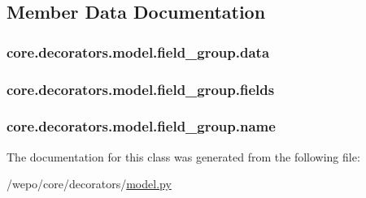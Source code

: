 \subsection{Member Data Documentation}
\hypertarget{classcore_1_1decorators_1_1model_1_1field__group_ade67e97a20f107664fd9f4d2fbddab57}{
\subsubsection[{data}]{\setlength{\rightskip}{0pt plus 5cm}core.\-decorators.\-model.\-field\-\_\-group.\-data}}\label{classcore_1_1decorators_1_1model_1_1field__group_ade67e97a20f107664fd9f4d2fbddab57}
\hypertarget{classcore_1_1decorators_1_1model_1_1field__group_a56e0be74f7aa784b96a5d1ee25589f5c}{
\subsubsection[{fields}]{\setlength{\rightskip}{0pt plus 5cm}core.\-decorators.\-model.\-field\-\_\-group.\-fields}}\label{classcore_1_1decorators_1_1model_1_1field__group_a56e0be74f7aa784b96a5d1ee25589f5c}
\hypertarget{classcore_1_1decorators_1_1model_1_1field__group_a18917138eb13e0aac794921e8b0b01c4}{
\subsubsection[{name}]{\setlength{\rightskip}{0pt plus 5cm}core.\-decorators.\-model.\-field\-\_\-group.\-name}}\label{classcore_1_1decorators_1_1model_1_1field__group_a18917138eb13e0aac794921e8b0b01c4}


The documentation for this class was generated from the following file\-:\begin{DoxyCompactItemize}
\item 
/wepo/core/decorators/\hyperlink{model_8py}{model.\-py}\end{DoxyCompactItemize}
